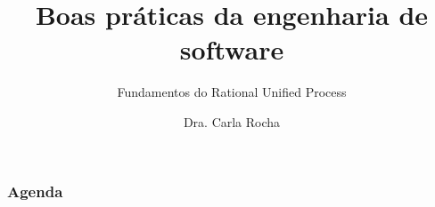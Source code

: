 \documentclass[12pt]{beamer}
\title{Boas práticas da engenharia de software}
\subtitle{Fundamentos do Rational Unified Process}
\author{Dra. Carla Rocha}
\institute{Engenharia de Software \\ Universidade de Brasília}
\date{}
\begin{document}
\frame{\titlepage \vspace{-0.5cm}
}
\frame
{
\frametitle{Agenda}
\tableofcontents%
}

\end{document}
